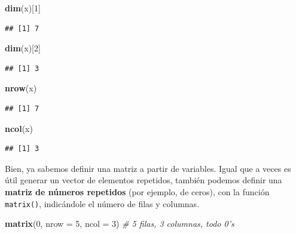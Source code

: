 \documentclass[11pt,]{book}
\newenvironment{Shaded}{\begin{snugshade}}{\end{snugshade}}
\newcommand{\CommentTok}[1]{\textcolor[rgb]{0.37,0.37,0.37}{\textit{#1}}}
\newcommand{\DataTypeTok}[1]{\textcolor[rgb]{0.27,0.27,0.27}{#1}}
\newcommand{\DecValTok}[1]{\textcolor[rgb]{0.06,0.06,0.06}{#1}}
\newcommand{\KeywordTok}[1]{\textcolor[rgb]{0.27,0.27,0.27}{\textbf{#1}}}
\newcommand{\NormalTok}[1]{#1}
\begin{document}
\begin{Shaded}
\begin{Highlighting}[]
\KeywordTok{dim}\NormalTok{(x)[}\DecValTok{1}\NormalTok{]}
\end{Highlighting}
\end{Shaded}

\begin{verbatim}
## [1] 7
\end{verbatim}

\begin{Shaded}
\begin{Highlighting}[]
\KeywordTok{dim}\NormalTok{(x)[}\DecValTok{2}\NormalTok{]}
\end{Highlighting}
\end{Shaded}

\begin{verbatim}
## [1] 3
\end{verbatim}

\begin{Shaded}
\begin{Highlighting}[]
\KeywordTok{nrow}\NormalTok{(x)}
\end{Highlighting}
\end{Shaded}

\begin{verbatim}
## [1] 7
\end{verbatim}

\begin{Shaded}
\begin{Highlighting}[]
\KeywordTok{ncol}\NormalTok{(x)}
\end{Highlighting}
\end{Shaded}

\begin{verbatim}
## [1] 3
\end{verbatim}

Bien, ya sabemos definir una matriz a partir de variables. Igual que a veces es útil generar un vector de elementos repetidos, también podemos definir una \textbf{matriz de números repetidos} (por ejemplo, de ceros), con la función \texttt{matrix()}, indicándole el número de filas y columnas.

\begin{Shaded}
\begin{Highlighting}[]
\KeywordTok{matrix}\NormalTok{(}\DecValTok{0}\NormalTok{, }\DataTypeTok{nrow =} \DecValTok{5}\NormalTok{, }\DataTypeTok{ncol =} \DecValTok{3}\NormalTok{) }\CommentTok{# 5 filas, 3 columnas, todo 0's}
\end{Highlighting}
\end{Shaded}
\end{document}
